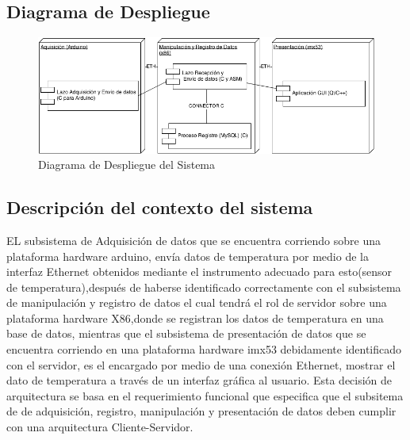 \subsection{\textcolor[gray]{.2}{Diagrama de Despliegue}}
\begin{figure}[h!]
 \begin{center}
  \includegraphics[width=1\textwidth,keepaspectratio=true]{img/Deployement.png}
  \caption{Diagrama de Despliegue del Sistema}
  \label{fig:esquema}
 \end{center}
\end{figure}

\subsection{\textcolor[gray]{.2}{Descripción del contexto del sistema}}

EL subsistema de Adquisición  de datos que se encuentra corriendo sobre una plataforma hardware arduino, envía datos de temperatura por medio de la interfaz Ethernet obtenidos mediante el instrumento adecuado para esto(sensor de temperatura),después de haberse identificado correctamente con el subsistema de manipulación y registro de datos el cual tendrá el rol de servidor sobre una plataforma hardware X86,donde se registran los datos de temperatura en una base de datos, mientras que el subsistema de presentación de datos que se encuentra corriendo en una plataforma hardware imx53 debidamente identificado con el servidor, es el encargado por medio de una conexión Ethernet, mostrar el dato de temperatura a través de un interfaz gráfica al usuario. 
Esta decisión de arquitectura se basa en el requerimiento funcional que especifica que el subsitema de de adquisición, registro, manipulación y presentación de datos  deben cumplir con una arquitectura Cliente-Servidor. 

\newpage

